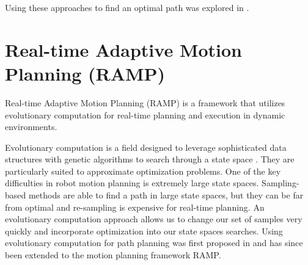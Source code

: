 \documentclass[10pt,conference]{ieeeconf}
\begin{document}










Using these approaches to find an optimal path was explored in \cite{karaman2011sampling}. 





\section{Real-time Adaptive Motion Planning (RAMP)}
	
Real-time Adaptive Motion Planning (RAMP) \cite{RAMP} is a framework that utilizes evolutionary computation for real-time planning and execution in dynamic environments. 

Evolutionary computation is a field designed to leverage sophisticated data structures with genetic algorithms to search through a state space \cite{michalewicz2013genetic}. They are particularly suited to approximate optimization problems. One of the key difficulties in robot motion planning is extremely large state spaces. Sampling-based methods are able to find a path in large state spaces, but they can be far from optimal and re-sampling is expensive for real-time planning. An evolutionary computation approach allows us to change our set of samples very quickly and incorporate optimization into our state spaces searches. Using evolutionary computation for path planning was first proposed in \cite{EPN_Adaptive} and has since been extended to the motion planning framework RAMP.
\end{document}
